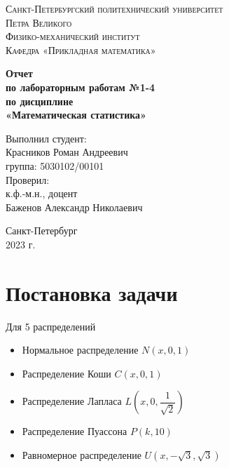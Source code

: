 \documentclass[12pt]{article}
\begin{document}
	\begin{titlepage}
		\begin{center}
			\textsc{Санкт-Петербургский политехнический университет\\Петра Великого\\[5mm]
				Физико-механический институт\\[2mm]
				Кафедра «Прикладная математика»}
			
			\vfill
			
			\textbf{Отчет\\по лабораторным работам №1-4\\по дисциплине\\«Математическая статистика»
				\\[26mm]
			}
		\end{center}
		
		\noindent
		\hspace*{100mm} Выполнил студент:\\[3mm]
		\hspace*{100mm} Красников Роман Андреевич\\
		\hspace*{100mm} группа: 5030102/00101\\[10mm]
		\hspace*{100mm} Проверил:\\[3mm]
		\hspace*{100mm} к.ф.-м.н., доцент\\
		\hspace*{100mm} Баженов Александр Николаевич
		
		\vspace*{\fill}
		\begin{center}
			Санкт-Петербург\\2023 г.
		\end{center}
	\end{titlepage}

	\section{Постановка задачи}
	
	Для 5 распределений
	
	\begin{itemize}
		\item Нормальное распределение $N(x,0,1)$
		\item Распределение Коши $C(x, 0, 1)$
		\item Распределение Лапласа $L\left(x, 0, \dfrac{1}{\sqrt{2}}\right)$
		\item Распределение Пуассона $P(k, 10)$
		\item Равномерное распределение $U(x, -\sqrt{3}, \sqrt{3})$
	\end{itemize}
\end{document}
